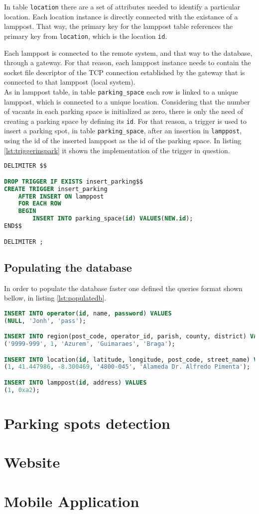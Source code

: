 In table \verb|location| there are a set of attributes needed to identify a particular location. Each location instance is directly connected with the existance of a lamppost. That way, the primary key for the lamppost table references the primary key from \verb|location|, which is the location \verb|id|.

Each lamppost is connected to the remote system, and that way to the database, through a gateway. For that reason, each lamppost instance needs to contain the socket file descriptor of the TCP connection established by the gateway that is connected to that lamppost (local system).\\

As in lamppost table, in table \verb|parking_space| each row is linked to a unique lamppost, which is connected to a unique location. Considering that the number of vacants in each parking space is initialized as zero, there is only the need of creating a parking space by defining its \verb|id|. For that reason, a trigger is used to insert a parking spot, in table \verb|parking_space|, after an insertion in \verb|lamppost|, using the id of the inserted lamppost as the id of the parking space. In listing \ref{lst:triggerinspark} it shown the implementation of the trigger in question.

\begin{lstlisting}[language=SQL, caption={Trigger to insert a parking spot after lampost insert.}, label={lst:triggerinspark}]
DELIMITER $$

DROP TRIGGER IF EXISTS insert_parking$$
CREATE TRIGGER insert_parking
	AFTER INSERT ON lamppost
	FOR EACH ROW
	BEGIN
		INSERT INTO parking_space(id) VALUES(NEW.id);
END$$

DELIMITER ;
\end{lstlisting}

\subsection{Populating the database}
In order to populate the database faster one defined the queries format shown bellow, in listing \ref{lst:populatedb}.

\begin{lstlisting}[language=SQL, caption={Queries examples to populate database.}, label={lst:populatedb}]
INSERT INTO operator(id, name, password) VALUES
(NULL, 'Jonh', 'pass');

INSERT INTO region(post_code, operator_id, parish, county, district) VALUES
('9999-999', 1, 'Azurem', 'Guimaraes', 'Braga');

INSERT INTO location(id, latitude, longitude, post_code, street_name) VALUES
(1, 41.447986, -8.300469, '4800-045', 'Alameda Dr. Alfredo Pimenta');

INSERT INTO lamppost(id, address) VALUES
(1, 0xa2);

\end{lstlisting}


\section{Parking spots detection}

\section{Website}

\section{Mobile Application}